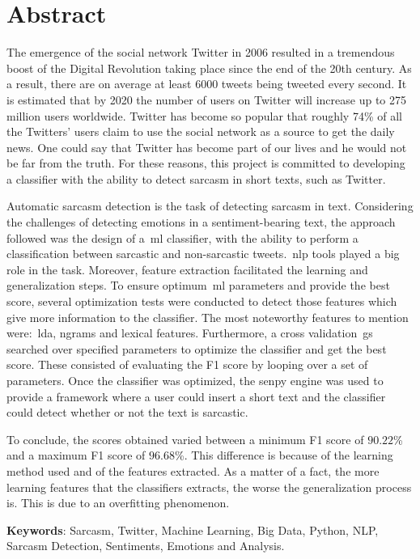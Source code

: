 \cleardoublepage
{}
\chapter*{Abstract}
The emergence of the social network Twitter in 2006 resulted in a tremendous boost of the Digital Revolution taking place since the end of the 20th century. As a result, there are on average at least 6000 tweets being tweeted every second. It is estimated that by 2020 the number of users on Twitter will increase up to 275 million users worldwide. Twitter has become so popular that roughly 74\% of all the Twitters' users claim to use the social network as a source to get the daily news. One could say that Twitter has become part of our lives and he would not be far from the truth. For these reasons, this project is committed to developing a classifier with the ability to detect sarcasm in short texts, such as Twitter. \par
Automatic sarcasm detection is the task of detecting sarcasm in text. Considering the challenges of detecting emotions in a sentiment-bearing text, the approach followed was the design of a~\acf{ml} classifier, with the ability to perform a classification between sarcastic and non-sarcastic tweets.~\acf{nlp} tools played a big role in the task. Moreover, feature extraction facilitated the learning and generalization steps. To ensure optimum~\ac{ml} parameters and provide the best score, several optimization tests were conducted to detect those features which give more information to the classifier. The most noteworthy features to mention were:~\acf{lda}, ngrams and lexical features. Furthermore, a cross validation~\acf{gs} searched over specified parameters to optimize the classifier and get the best score. These consisted of evaluating the F1 score by looping over a set of parameters.  Once the classifier was optimized, the senpy engine was used to provide a framework where a user could insert a short text and the classifier could detect whether or not the text is sarcastic.\par
To conclude, the scores obtained varied between a minimum F1 score of $90.22$\% and a maximum F1 score of $96.68$\%. This difference is because of the learning method used and of the features extracted. As a matter of a fact, the more learning features that the classifiers extracts, the worse the generalization process is. This is due to an overfitting phenomenon.



\vfill
\textbf{Keywords}: Sarcasm, Twitter, Machine Learning, Big Data, Python, NLP, Sarcasm Detection, Sentiments, Emotions and Analysis.